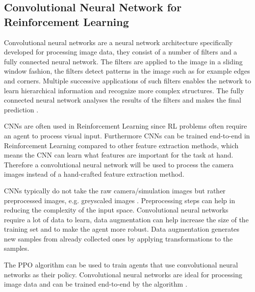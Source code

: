 \subsection*{Convolutional Neural Network for Reinforcement Learning}

Convolutional neural networks are a neural network architecture specifically developed for processing image data, they consist of a number of filters and a fully connected neural network. The filters are applied to the image in a sliding window fashion, the filters detect patterns in the image such as for example edges and corners. Multiple successive applications of such filters enables the network to learn hierarchical information and recognize more complex structures. The fully connected neural network analyses the results of the filters and makes the final prediction \textcite{rlbook2020}.

CNNs are often used in Reinforcement Learning since RL problems often require an agent to process visual input. Furthermore CNNs can be trained end-to-end in Reinforcement Learning compared to other feature extraction methods, which means the CNN can learn what features are important for the task at hand.
Therefore a convolutional neural network will be used to process the camera images instead of a hand-crafted feature extraction method. 

CNNs typically do not take the raw camera/simulation images but rather preprocessed images, e.g. greyscaled images \textcite{atari}. Preprocessing steps can help in reducing the complexity of the input space. Convolutional neural networks require a lot of data to learn, data augmentation can help increase the size of the training set and to make the agent more robust. Data augmentation generates new samples from already collected ones by applying transformations to the samples. 


The PPO algorithm can be used to train agents that use convolutional neural networks as their policy. Convolutional neural networks are ideal for processing image data and can be trained end-to-end by the algorithm \textcite{ppo}. 









